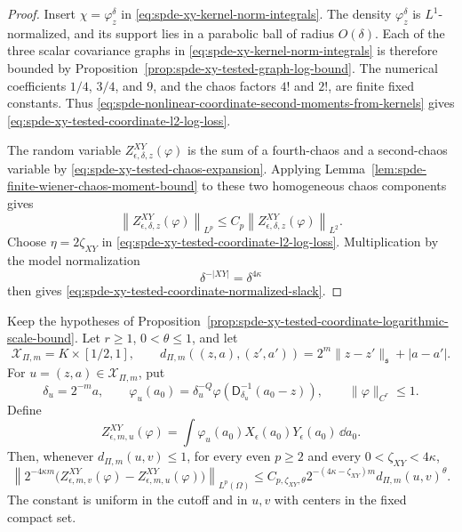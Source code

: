 \begin{proof}
Insert \(\chi=\varphi_z^\delta\) in
\eqref{eq:spde-xy-kernel-norm-integrals}.  The density
\(\varphi_z^\delta\) is \(L^1\)-normalized, and its support lies in a
parabolic ball of radius \(O(\delta)\).  Each of the three scalar covariance
graphs in \eqref{eq:spde-xy-kernel-norm-integrals} is therefore bounded by
Proposition~\ref{prop:spde-xy-tested-graph-log-bound}.  The numerical
coefficients \(1/4\), \(3/4\), and \(9\), and the chaos factors \(4!\) and
\(2!\), are finite fixed constants.  Thus
\eqref{eq:spde-nonlinear-coordinate-second-moments-from-kernels} gives
\eqref{eq:spde-xy-tested-coordinate-l2-log-loss}.

The random variable \(Z_{\epsilon,\delta,z}^{XY}(\varphi)\) is the sum of a
fourth-chaos and a second-chaos variable by
\eqref{eq:spde-xy-tested-chaos-expansion}.  Applying
Lemma~\ref{lem:spde-finite-wiener-chaos-moment-bound} to these two
homogeneous chaos components gives
\[
  \left\|Z_{\epsilon,\delta,z}^{XY}(\varphi)\right\|_{L^p}
  \leq
  C_p
  \left\|Z_{\epsilon,\delta,z}^{XY}(\varphi)\right\|_{L^2}.
 \]
Choose \(\eta=2\zeta_{XY}\) in
\eqref{eq:spde-xy-tested-coordinate-l2-log-loss}.  Multiplication by the
model normalization
\[
  \delta^{-|XY|}=\delta^{4\kappa}
\]
then gives
\eqref{eq:spde-xy-tested-coordinate-normalized-slack}.
\end{proof}

\begin{proposition}
\label{prop:spde-xy-tested-coordinate-parameter-edge-bound}
Keep the hypotheses of
Proposition~\ref{prop:spde-xy-tested-coordinate-logarithmic-scale-bound}.
Let \(r\geq1\), \(0<\theta\leq1\), and let
\[
  \mathcal X_{\Pi,m}=K\times[1/2,1],
  \qquad
  d_{\Pi,m}((z,a),(z',a'))=2^m\|z-z'\|_{\mathfrak s}+|a-a'|.
\]
For \(u=(z,a)\in\mathcal X_{\Pi,m}\), put
\[
  \delta_u=2^{-m}a,\qquad
  \varphi_u(a_0)
  =
  \delta_u^{-Q}\varphi(\mathsf D_{\delta_u}^{-1}(a_0-z)),
  \qquad \|\varphi\|_{C^r}\leq1 .
\]
Define
\[
  Z_{\epsilon,m,u}^{XY}(\varphi)
  =
  \int \varphi_u(a_0)X_\epsilon(a_0)Y_\epsilon(a_0)\,\dd a_0 .
\]
Then, whenever \(d_{\Pi,m}(u,v)\leq1\), for every even \(p\geq2\) and
every \(0<\zeta_{XY}<4\kappa\),
\begin{equation}
  \left\|
    2^{-4\kappa m}
    \bigl(
      Z_{\epsilon,m,v}^{XY}(\varphi)
      -Z_{\epsilon,m,u}^{XY}(\varphi)
    \bigr)
  \right\|_{L^p(\Omega)}
  \leq
  C_{p,\zeta_{XY},\theta}
  2^{-(4\kappa-\zeta_{XY})m}
  d_{\Pi,m}(u,v)^\theta .
  \label{eq:spde-xy-tested-coordinate-edge-normalized}
\end{equation}
The constant is uniform in the cutoff and in \(u,v\) with centers in the
fixed compact set.
\end{proposition}

